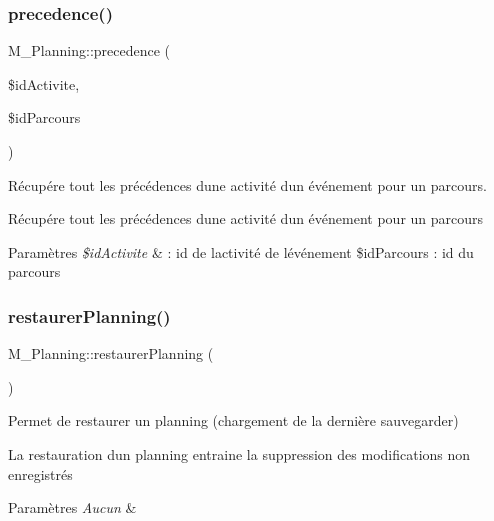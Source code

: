\subsubsection{\texorpdfstring{precedence()}{precedence()}}
{\footnotesize\ttfamily M\+\_\+\+Planning\+::precedence (\begin{DoxyParamCaption}\item[{}]{\$id\+Activite,  }\item[{}]{\$id\+Parcours }\end{DoxyParamCaption})}



Récupére tout les précédences d\textquotesingle{}une activité d\textquotesingle{}un événement pour un parcours. 

Récupére tout les précédences d\textquotesingle{}une activité d\textquotesingle{}un événement pour un parcours 
\begin{DoxyParams}{Paramètres}
{\em \$id\+Activite} & \+: id de l\textquotesingle{}activité de l\textquotesingle{}événement \$id\+Parcours \+: id du parcours \\
\hline
\end{DoxyParams}
\mbox{\label{class_m___planning_a369517047c830bb2298e908b6d296240}} 
\subsubsection{\texorpdfstring{restaurer\+Planning()}{restaurerPlanning()}}
{\footnotesize\ttfamily M\+\_\+\+Planning\+::restaurer\+Planning (\begin{DoxyParamCaption}{ }\end{DoxyParamCaption})}



Permet de restaurer un planning (chargement de la dernière sauvegarder) 

La restauration d\textquotesingle{}un planning entraine la suppression des modifications non enregistrés 
\begin{DoxyParams}{Paramètres}
{\em Aucun} & \\
\hline
\end{DoxyParams}
\mbox{\label{class_m___planning_af6dd0d894ed8b352cd3c5dba0542d645}} 
